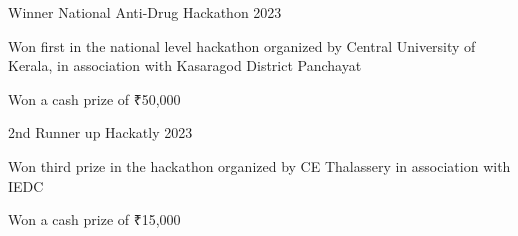 
\begin{cventries}
  \cventry
    {Winner} %
    {National Anti-Drug Hackathon} %
    {}
    {2023} %
    {
      \begin{cvitems}
          \item {Won first in the national level hackathon organized by Central University of Kerala, in association with Kasaragod District Panchayat}
          \item {Won a cash prize of ₹50,000}
      \end{cvitems}
    }
  \cventry
    {2nd Runner up}
    {Hackatly}
    {}
    {2023}
    {
      \begin{cvitems}
          \item {Won third prize in the hackathon organized by CE Thalassery in association with IEDC}
          \item {Won a cash prize of ₹15,000}
      \end{cvitems}
    }
\end{cventries}
